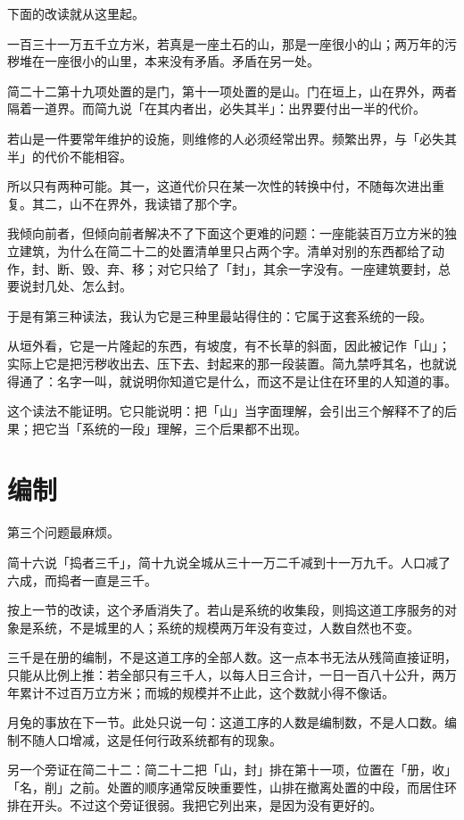 下面的改读就从这里起。

一百三十一万五千立方米，若真是一座土石的山，那是一座很小的山；两万年的污秽堆在一座很小的山里，本来没有矛盾。矛盾在另一处。

简二十二第十九项处置的是门，第十一项处置的是山。门在垣上，山在界外，两者隔着一道界。而简九说「在其内者出，必失其半」：出界要付出一半的代价\nobreak。

若山是一件要常年维护的设施，则维修的人必须经常出界。频繁出界，与「必失其半」的代价不能相容。

所以只有两种可能。其一，这道代价只在某一次性的转换中付，不随每次进出重复。其二，山不在界外，我读错了那个字。

我倾向前者，但倾向前者解决不了下面这个更难的问题：一座能装百万立方米的独立建筑，为什么在简二十二的处置清单里只占两个字。清单对别的东西都给了动作，封、断、毁、弃、移；对它只给了「封」，其余一字没有。一座建筑要封，总要说封几处、怎么封。

于是有第三种读法，我认为它是三种里最站得住的：它属于这套系统的一段\nobreak。

从垣外看，它是一片隆起的东西，有坡度，有不长草的斜面，因此被记作「山」；实际上它是把污秽收出去、压下去、封起来的那一段装置。简九禁呼其名，也就说得通了：名字一叫，就说明你知道它是什么，而这不是让住在环里的人知道的事。

这个读法不能证明。它只能说明：把「山」当字面理解，会引出三个解释不了的后果；把它当「系统的一段」理解，三个后果都不出现。

\section{编制}

第三个问题最麻烦。

简十六说「捣者三千」，简十九说全城从三十一万二千减到十一万九千。人口减了六成，而捣者一直是三千。

按上一节的改读，这个矛盾消失了。若山是系统的收集段，则捣这道工序服务的对象是系统，不是城里的人；系统的规模两万年没有变过，人数自然也不变。

三千是在册的编制，不是这道工序的全部人数。这一点本书无法从残简直接证明，只能从比例上推：若全部只有三千人，以每人日三合计，一日一百八十公升，两万年累计不过百万立方米；而城的规模并不止此，这个数就小得不像话。

月兔的事放在下一节。此处只说一句：这道工序的人数是编制数，不是人口数。编制不随人口增减，这是任何行政系统都有的现象。

另一个旁证在简二十二：简二十二把「山，封」排在第十一项，位置在「册，收」「名，削」之前。处置的顺序通常反映重要性，山排在撤离处置的中段，而居住环排在开头。不过这个旁证很弱。我把它列出来，是因为没有更好的。

